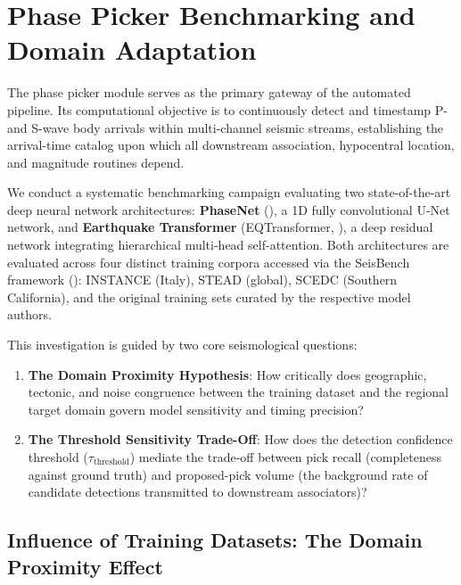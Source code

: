 \section{Phase Picker Benchmarking and Domain Adaptation}
\label{sec:picker_benchmarking}

The phase picker module serves as the primary gateway of the automated pipeline. Its computational objective is to continuously detect and timestamp P- and S-wave body arrivals within multi-channel seismic streams, establishing the arrival-time catalog upon which all downstream association, hypocentral location, and magnitude routines depend.

We conduct a systematic benchmarking campaign evaluating two state-of-the-art deep neural network architectures: \textbf{PhaseNet} (\cite{PhaseNet}), a 1D fully convolutional U-Net network, and \textbf{Earthquake Transformer} (\ac{EQTransformer}, \cite{EQTransformer}), a deep residual network integrating hierarchical multi-head self-attention. Both architectures are evaluated across four distinct training corpora accessed via the SeisBench framework (\cite{SeisBench}): \ac{INSTANCE} (Italy), \ac{STEAD} (global), \ac{SCEDC} (Southern California), and the original training sets curated by the respective model authors.

This investigation is guided by two core seismological questions:
\begin{enumerate}
  \item \textbf{The Domain Proximity Hypothesis}: How critically does geographic, tectonic, and noise congruence between the training dataset and the regional target domain govern model sensitivity and timing precision?
  \item \textbf{The Threshold Sensitivity Trade-Off}: How does the detection confidence threshold ($\tau_{\mathrm{threshold}}$) mediate the trade-off between pick recall (completeness against ground truth) and proposed-pick volume (the background rate of candidate detections transmitted to downstream associators)?
\end{enumerate}

\subsection{Influence of Training Datasets: The Domain Proximity Effect}
\label{subsec:training_datasets_influence}

